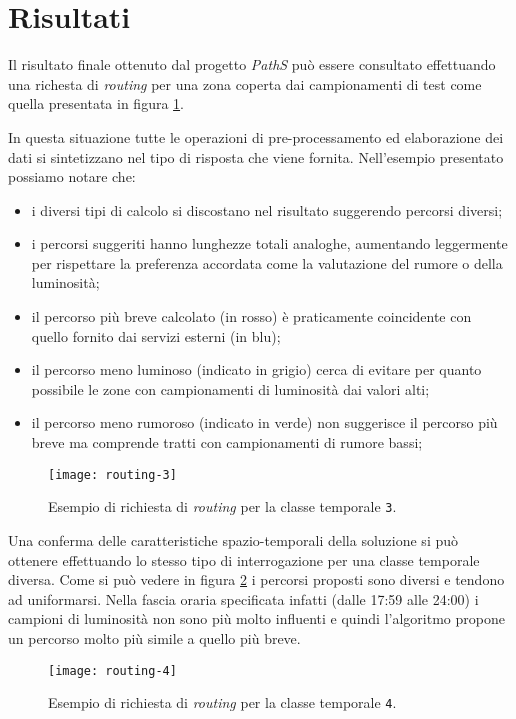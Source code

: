 \section{Risultati}
Il risultato finale ottenuto dal progetto \emph{PathS} può essere consultato effettuando una richesta di \emph{routing} per una zona coperta dai campionamenti di test come quella presentata in figura \ref{fig:routing-3}.

In questa situazione tutte le operazioni di pre-processamento ed elaborazione dei dati si sintetizzano nel tipo di risposta che viene fornita. Nell'esempio presentato possiamo notare che:

\begin{itemize}
  \item i diversi tipi di calcolo si discostano nel risultato suggerendo percorsi diversi;
  \item i percorsi suggeriti hanno lunghezze totali analoghe, aumentando leggermente per rispettare la preferenza accordata come la valutazione del rumore o della luminosità;
  \item il percorso più breve calcolato (in rosso) è praticamente coincidente con quello fornito dai servizi esterni (in blu);
  \item il percorso meno luminoso (indicato in grigio) cerca di evitare per quanto possibile le zone con campionamenti di luminosità dai valori alti;
  \item il percorso meno rumoroso (indicato in verde) non suggerisce il percorso più breve ma comprende tratti con campionamenti di rumore bassi;
\end{itemize}

\begin{figure}[ht]
  \centering
  \texttt{[image: routing-3]}
  \caption{\footnotesize{Esempio di richiesta di \emph{routing} per la classe temporale \texttt{3}.}}
  \label{fig:routing-3}
\end{figure}

Una conferma delle caratteristiche spazio-temporali della soluzione si può ottenere effettuando lo stesso tipo di interrogazione per una classe temporale diversa. Come si può vedere in figura \ref{fig:routing-4} i percorsi proposti sono diversi e tendono ad uniformarsi. Nella fascia oraria specificata infatti (dalle 17:59 alle 24:00) i campioni di luminosità non sono più molto influenti e quindi l'algoritmo propone un percorso molto più simile a quello più breve.

\begin{figure}[ht]
  \centering
  \texttt{[image: routing-4]}
  \caption{\footnotesize{Esempio di richiesta di \emph{routing} per la classe temporale \texttt{4}.}}
  \label{fig:routing-4}
\end{figure}

